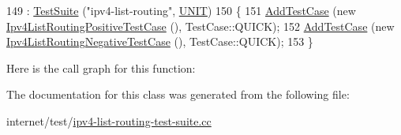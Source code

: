 \begin{DoxyCode}
149     : \hyperlink{classns3_1_1TestSuite_a904b0c40583b744d30908aeb94636d1a}{TestSuite} (\textcolor{stringliteral}{"ipv4-list-routing"}, \hyperlink{classns3_1_1TestSuite_a1ebfcab34ec8161e085e8e3a1855eae0a3885375a3787abf60431f8454b3cadbd}{UNIT})
150   \{
151     \hyperlink{classns3_1_1TestCase_a3718088e3eefd5d6454569d2e0ddd835}{AddTestCase} (\textcolor{keyword}{new} \hyperlink{classIpv4ListRoutingPositiveTestCase}{Ipv4ListRoutingPositiveTestCase} (), 
      TestCase::QUICK);
152     \hyperlink{classns3_1_1TestCase_a3718088e3eefd5d6454569d2e0ddd835}{AddTestCase} (\textcolor{keyword}{new} \hyperlink{classIpv4ListRoutingNegativeTestCase}{Ipv4ListRoutingNegativeTestCase} (), 
      TestCase::QUICK);
153   \}
\end{DoxyCode}


Here is the call graph for this function\+:




The documentation for this class was generated from the following file\+:\begin{DoxyCompactItemize}
\item 
internet/test/\hyperlink{ipv4-list-routing-test-suite_8cc}{ipv4-\/list-\/routing-\/test-\/suite.\+cc}\end{DoxyCompactItemize}
